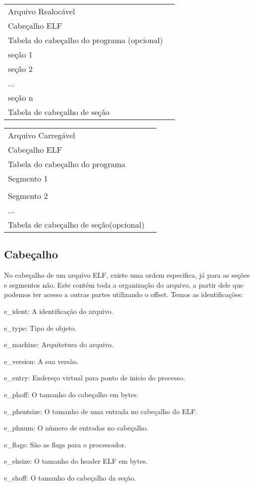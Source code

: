 \begin{list}{}
\item {\begin{tabular}{|l|c|}
\hline
 Arquivo Realocável & \tabularnewline
\cline{1-1}  
Cabeçalho ELF & \tabularnewline
\cline{1-1}
Tabela do cabeçalho do programa (opcional) & \tabularnewline
\cline{1-1} 
seção 1 & \tabularnewline
\cline{1-1} 
seção 2 & \tabularnewline
\cline{1-1} 
... & \tabularnewline
\cline{1-1}
seção n & \tabularnewline
\cline{1-1} 
Tabela de cabeçalho de seção & \tabularnewline
\cline{1-1}
\end{tabular}
\begin{tabular}{|l|c|}
\hline
Arquivo Carregável &\tabularnewline
\cline{1-1}
Cabeçalho ELF & \tabularnewline
\cline{1-1}
Tabela do cabeçalho do programa & \tabularnewline
\cline{1-1} 
Segmento 1 & \tabularnewline
\cline{1-1} 
 & \tabularnewline
\cline{1-1}
Segmento 2 & \tabularnewline
\cline{1-1}
... & \tabularnewline
\cline{1-1}
Tabela de cabeçalho de seção(opcional) & \tabularnewline
\cline{1-1}
\end{tabular}}
\end{list}


\subsection{Cabeçalho}
   No cabeçalho de um arquivo ELF, existe uma ordem especifica, já para as seções e segmentos não.
   Este contém toda a organização do arquivo, a partir dele que podemos ter acesso a outras partes utilizando o offset.
   Temos as identificações:

   e_ident: A identificação do arquivo.

   e_type: Tipo de objeto.

   e_machine: Arquitetura do arquivo.
   
   e_version: A sua versão.
  
   e_entry: Endereço virtual para ponto de inicio do processo.
   
   e_phoff: O tamanho do cabeçalho em bytes.
   
   e_phentsize: O tamanho de uma entrada no cabeçalho do ELF.
   
   e_phnum: O número de entradas no cabeçalho.
   
   e_flags: São as flags para o processador.
   
   e_ehsize: O tamanho do header ELF em bytes.
   
   e_shoff: O tamanho do cabeçalho da seção.
   
